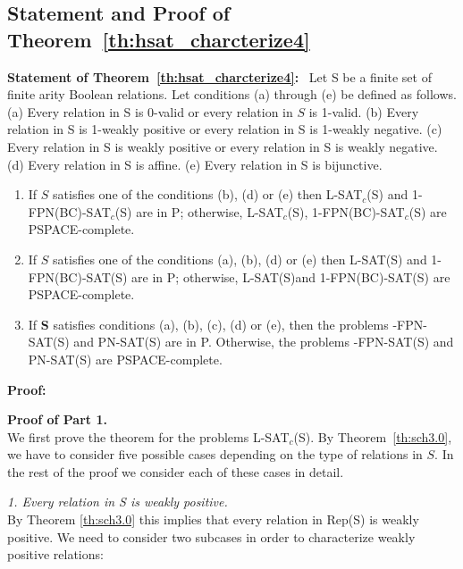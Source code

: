 \subsection{Statement and Proof of Theorem~\ref{th:hsat_charcterize4}}

\noindent
\textbf{Statement of Theorem~\ref{th:hsat_charcterize4}:}~
Let S be a finite set of finite arity Boolean relations. Let conditions
(a) through (e) be defined as follows.
(a) Every relation in S is 0-valid or every relation in $S$ is 1-valid.
(b) Every relation in S is 1-weakly positive or
every relation in S is 1-weakly negative.
(c) Every relation in S is weakly positive or
every relation in S is weakly negative.
(d) Every relation in S is affine.
(e) Every relation in S is bijunctive.
\begin{enumerate}
\item
If $S$ satisfies one of the conditions (b), (d) or (e)
then L-SAT$_c$(S) and 1-FPN(BC)-SAT$_c$(S) are in P; otherwise,
L-SAT$_c$(S), 1-FPN(BC)-SAT$_c$(S) are  PSPACE-complete.

\item
If $S$ satisfies one of the conditions (a), (b), (d) or (e)
then L-SAT(S) and 1-FPN(BC)-SAT(S) are in P; otherwise, L-SAT(S)and 
1-FPN(BC)-SAT(S) are PSPACE-complete.

\item
If {\bf S} satisfies conditions (a), (b), (c), (d) or  (e), then the problems  
{-FPN-SAT(S)} and PN-SAT(S)  are in P. Otherwise, 
the problems  {-FPN-SAT(S)} and PN-SAT(S)  are  PSPACE-complete.
\end{enumerate}

\noindent
\textbf{Proof:} 

\noindent
{\bf Proof of Part 1.}\\
We first prove the theorem for the problems L-SAT$_c$(S).
By Theorem~\ref{th:sch3.0}, we have to consider five possible cases
depending on the type of relations in $S$. In the rest of the proof we
consider each of these cases in detail.

\noindent
{\em 1. Every relation in {\sf S} is weakly positive.}\\
By Theorem \ref{th:sch3.0} this implies that 
every relation in {\sf Rep(S)} is weakly positive. 
We need to consider two subcases in order to characterize weakly positive
relations:

